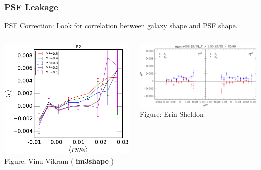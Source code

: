 \documentclass{beamer}
\newcommand{\imshape}{ {\bf im3shape} }
\begin{document}
\frame
{
    \frametitle{PSF Leakage}

    PSF Correction: Look for correlation between galaxy shape and PSF shape.

    \begin{columns}
        \begin{column}{0.38\textwidth}
            \begin{center}
                \includegraphics[width=\textwidth]{im3shape-PSF-E2.pdf}
                \newline
                {\tiny Figure: Vinu Vikram (\imshape)}
            \end{center}
        \end{column}
        \begin{column}{0.62\textwidth}
            \begin{center}
            \includegraphics[width=\textwidth]{ngmix009-e-vs-epsf-Ts2n-min-1-s2n-min-20.pdf}
                \newline
                {\tiny Figure: Erin Sheldon}
            \end{center}
        \end{column}
    \end{columns}
}
\end{document}
